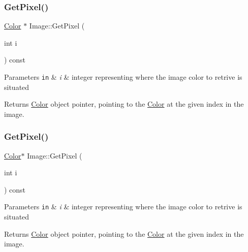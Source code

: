 \subsubsection{\texorpdfstring{Get\+Pixel()}{GetPixel()}\hspace{0.1cm}{\footnotesize\ttfamily [3/4]}}
{\footnotesize\ttfamily \hyperlink{classColor}{Color} $\ast$ Image\+::\+Get\+Pixel (\begin{DoxyParamCaption}\item[{int}]{i }\end{DoxyParamCaption}) const}


\begin{DoxyParams}[1]{Parameters}
\mbox{\tt in}  & {\em i} & integer representing where the image color to retrive is situated\\
\hline
\end{DoxyParams}
\begin{DoxyReturn}{Returns}
\hyperlink{classColor}{Color} object pointer, pointing to the \hyperlink{classColor}{Color} at the given index in the image. 
\end{DoxyReturn}
\mbox{\label{classImage_aa54365cbbea7a483c275e8898b1ed119}} 
\subsubsection{\texorpdfstring{Get\+Pixel()}{GetPixel()}\hspace{0.1cm}{\footnotesize\ttfamily [4/4]}}
{\footnotesize\ttfamily \hyperlink{classColor}{Color}$\ast$ Image\+::\+Get\+Pixel (\begin{DoxyParamCaption}\item[{int}]{i }\end{DoxyParamCaption}) const}


\begin{DoxyParams}[1]{Parameters}
\mbox{\tt in}  & {\em i} & integer representing where the image color to retrive is situated\\
\hline
\end{DoxyParams}
\begin{DoxyReturn}{Returns}
\hyperlink{classColor}{Color} object pointer, pointing to the \hyperlink{classColor}{Color} at the given index in the image. 
\end{DoxyReturn}
\mbox{\label{classImage_a8ee1acb5476bf0fecac66f5dfdd47a38}} 
